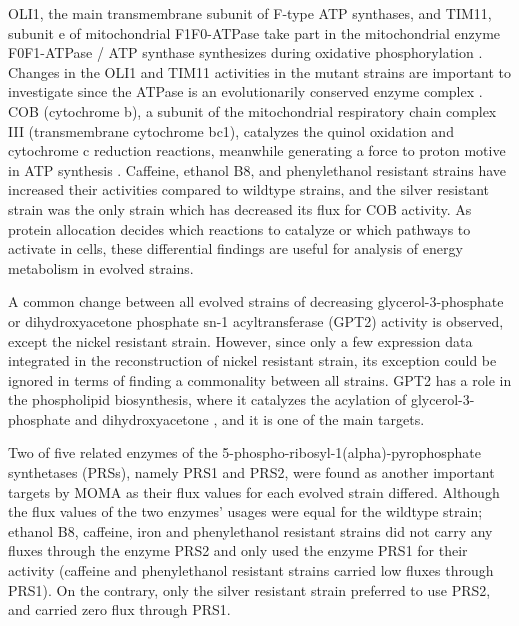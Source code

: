 OLI1, the main transmembrane subunit of F-type ATP synthases, and TIM11, subunit e of mitochondrial F1F0-ATPase take part in the mitochondrial enzyme F0F1-ATPase / ATP synthase synthesizes during oxidative phosphorylation \cite{arnold1997yeast, trembath1975biogenesis}. Changes in the OLI1 and TIM11 activities in the mutant strains  are important to investigate since the ATPase is an evolutionarily conserved enzyme complex \cite{tokatlidis1996translocation}. COB (cytochrome b), a subunit of the mitochondrial respiratory chain complex III (transmembrane cytochrome bc1), catalyzes the quinol oxidation and cytochrome c reduction reactions, meanwhile generating a force to proton motive in ATP synthesis \cite{meunier2013respiratory}. Caffeine, ethanol B8, and phenylethanol resistant strains have increased their activities compared to wildtype strains, and the silver resistant strain was the only strain which has decreased its flux for COB activity. As protein allocation decides which reactions to catalyze or which pathways to activate in cells, these differential findings are useful for analysis of energy metabolism in evolved strains.

A common change between all evolved strains of decreasing glycerol-3-phosphate or dihydroxyacetone phosphate sn-1 acyltransferase (GPT2) activity is observed, except the nickel resistant strain. However, since only a few expression data integrated in the reconstruction of nickel resistant strain, its exception could be ignored in terms of finding a commonality between all strains. GPT2 has a role in the phospholipid biosynthesis, where it catalyzes the acylation of glycerol-3-phosphate and dihydroxyacetone \cite{athenstaedt1997biosynthesis}, and it is one of the main targets.

Two of five related enzymes of the 5-phospho-ribosyl-1(alpha)-pyrophosphate synthetases (PRSs), namely PRS1 and PRS2, were found as another important targets by MOMA as their flux values for each evolved strain differed. Although the flux values of the two enzymes' usages were equal for the wildtype strain; ethanol B8, caffeine, iron and phenylethanol resistant strains did not carry any fluxes through the enzyme PRS2 and only used the enzyme PRS1 for their activity (caffeine and phenylethanol resistant strains carried low fluxes through PRS1). On the contrary, only the silver resistant strain preferred to use PRS2, and carried zero flux through PRS1.

